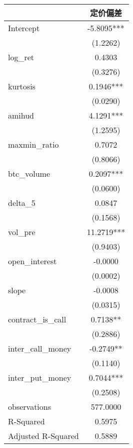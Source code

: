 \begin{tabular}{lc}
\hline
                   &    定价偏差     \\
\midrule
\midrule
Intercept          & -5.8095***  \\
                   & (1.2262)    \\
log\_ret           & 0.4303      \\
                   & (0.3276)    \\
kurtosis           & 0.1946***   \\
                   & (0.0290)    \\
amihud             & 4.1291***   \\
                   & (1.2595)    \\
maxmin\_ratio      & 0.7072      \\
                   & (0.8066)    \\
btc\_volume        & 0.2097***   \\
                   & (0.0600)    \\
delta\_5           & 0.0847      \\
                   & (0.1568)    \\
vol\_pre           & 11.2719***  \\
                   & (0.9403)    \\
open\_interest     & -0.0000     \\
                   & (0.0002)    \\
slope              & -0.0008     \\
                   & (0.0315)    \\
contract\_is\_call & 0.7138**    \\
                   & (0.2886)    \\
inter\_call\_money & -0.2749**   \\
                   & (0.1140)    \\
inter\_put\_money  & 0.7044***   \\
                   & (0.2508)    \\
observations       & 577.0000    \\
R-Squared          & 0.5975      \\
Adjusted R-Squared & 0.5889      \\
\hline
\end{tabular}